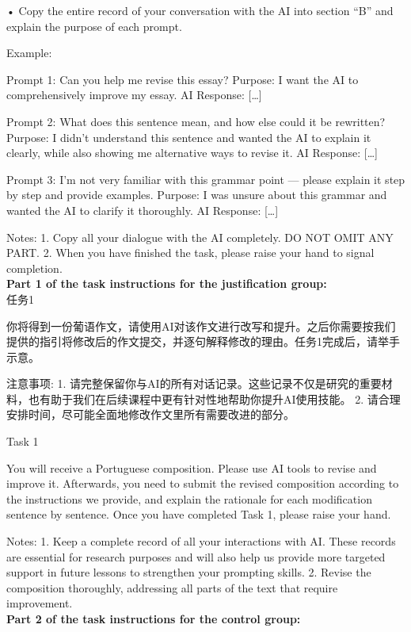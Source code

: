 \documentclass[english]{textolivre}
\begin{document}
• Copy the entire record of your conversation with the AI into section “B” and explain the purpose of each prompt.

Example:

Prompt 1: Can you help me revise this essay?
Purpose: I want the AI to comprehensively improve my essay.
AI Response: […]

Prompt 2: What does this sentence mean, and how else could it be rewritten?
Purpose: I didn’t understand this sentence and wanted the AI to explain it clearly, while also showing me alternative ways to revise it.
AI Response: […]

Prompt 3: I’m not very familiar with this grammar point — please explain it step by step and provide examples.
Purpose: I was unsure about this grammar and wanted the AI to clarify it thoroughly.
AI Response: […]

Notes:
1.	Copy all your dialogue with the AI completely. DO NOT OMIT ANY PART.
2.	When you have finished the task, please raise your hand to signal completion.\\


\noindent\textbf{Part 1 of the task instructions for the justification group:} \\

任务1

你将得到一份葡语作文，请使用AI对该作文进行改写和提升。之后你需要按我们提供的指引将修改后的作文提交，并逐句解释修改的理由。任务1完成后，请举手示意。

注意事项:
1.	请完整保留你与AI的所有对话记录。这些记录不仅是研究的重要材料，也有助于我们在后续课程中更有针对性地帮助你提升AI使用技能。
2.	请合理安排时间，尽可能全面地修改作文里所有需要改进的部分。

Task 1

You will receive a Portuguese composition. Please use AI tools to revise and improve it. Afterwards, you need to submit the revised composition according to the instructions we provide, and explain the rationale for each modification sentence by sentence.
Once you have completed Task 1, please raise your hand.

Notes:
1.	Keep a complete record of all your interactions with AI. These records are essential for research purposes and will also help us provide more targeted support in future lessons to strengthen your prompting skills.
2.	Revise the composition thoroughly, addressing all parts of the text that require improvement.\\

\noindent\textbf{Part 2 of the task instructions for the control group:} \\
\end{document}
